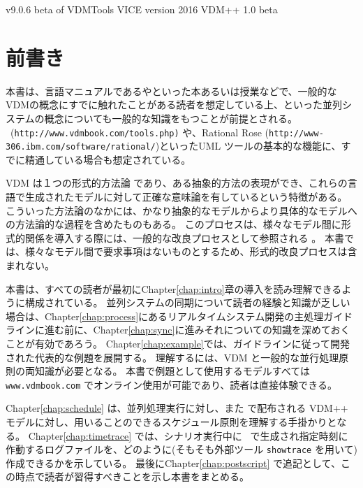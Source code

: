 \documentclass[\pformat,12pt]{jreport}
\newcommand{\vdmtoolsver}{v9.0.6 beta of VDMTools VICE version}
\begin{document}
       {\vdmtoolsver}
       {2016}
       {VDM++}
       {1.0 beta}

\chapter*{前書き}

本書は、言語マニュアルである\cite{LangManPP}や\cite{Fitzgerald&05}といった本あるいは授業などで、一般的なVDMの概念にすでに触れたことがある読者を想定している上、\cite{Ben-Ari82,Hoare85,Chandy&88,Milner89,Lea99}といった並列システムの概念についても一般的な知識をもつことが前提とされる。
\VDMTools\ (\texttt{http://www.vdmbook.com/tools.php)} や、Rational Rose (\texttt{http://www-306.ibm.com/software/rational/})といったUML ツールの基本的な機能に、すでに精通している場合も想定されている。

VDM \cite{Jones90a,Dawes91,Fitzgerald&98} は１つの形式的方法論\cite{Craigen&93b,Hinchey&95} であり、ある抽象的方法の表現ができ、これらの言語で生成されたモデルに対して正確な意味論を有しているという特徴がある。
こういった方法論のなかには、かなり抽象的なモデルからより具体的なモデルへの方法論的な過程を含めたものもある。
このプロセスは、様々なモデル間に形式的関係を導入する際には、一般的な改良プロセスとして参照される \cite{Jones90a,Morgan90a,Woodcock&96,Back&98}。
本書では、様々なモデル間で要求事項はないものとするため、形式的改良プロセスは含まれない。

本書は、すべての読者が最初にChapter\ref{chap:intro}章の導入を読み理解できるように構成されている。
並列システムの同期について読者の経験と知識が乏しい場合は、Chapter\ref{chap:process}にあるリアルタイムシステム開発の主処理ガイドラインに進む前に、Chapter\ref{chap:sync}に進みそれについての知識を深めておくことが有効であろう。
Chapter\ref{chap:example}では、ガイドラインに従って開発された代表的な例題を展開する。
理解するには、VDM と一般的な並行処理原則の両知識が必要となる。
本書で例題として使用するモデルすべては \texttt{www.vdmbook.com} でオンライン使用が可能であり、読者は直接体験できる。

Chapter\ref{chap:schedule} は、並列処理実行に対し、また \VDMTools で配布される VDM++ モデルに対し、用いることのできるスケジュール原則を理解する手掛かりとなる。
Chapter\ref{chap:timetrace} では、シナリオ実行中に \VDMTools\ で生成され指定時刻に作動するログファイルを、どのように(そもそも外部ツール \texttt{showtrace} を用いて)作成できるかを示している。
最後にChapter\ref{chap:postscript} で追記として、この時点で読者が習得すべきことを示し本書をまとめる。
\end{document}
